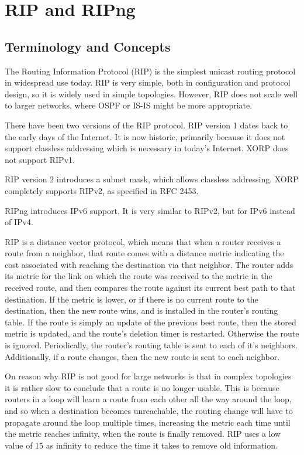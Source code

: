 %
%

\chapter{RIP and RIPng}
\label{rip}
\section{Terminology and Concepts}

The Routing Information Protocol (RIP) is the simplest unicast routing
protocol in widespread use today.  RIP is very simple, both in
configuration and protocol design, so it is widely used in simple
topologies.  However, RIP does not scale well to larger networks,
where OSPF or IS-IS might be more appropriate.

There have been two versions of the RIP protocol.  RIP version 1 dates
back to the early days of the Internet.  It is now historic, primarily
because it does not support classless addressing which is necessary in
today's Internet.  XORP does not support RIPv1.  

RIP version 2 introduces a subnet mask, which allows classless
addressing.  XORP completely supports RIPv2, as specified in RFC 2453.

RIPng introduces IPv6 support.  It is very similar to RIPv2, but for
IPv6 instead of IPv4.

RIP is a distance vector protocol, which means that when a router
receives a route from a neighbor, that route comes with a distance
metric indicating the cost associated with reaching the destination
via that neighbor.  The router adds its metric for the link on which
the route was received to the metric in the received route, and then
compares the route against its current best path to that destination.
If the metric is lower, or if there is no current route to the
destination, then the new route wins, and is installed in the router's
routing table.  If the route is simply an update of the previous best
route, then the stored metric is updated, and the route's deletion
timer is restarted.  Otherwise the route is ignored.  Periodically,
the router's routing table is sent to each of it's neighbors.
Additionally, if a route changes, then the new route is sent to each
neighbor.

On reason why RIP is not good for large networks is that in complex
topologies it is rather slow to conclude that a route is no longer
usable.  This is because routers in a loop will learn a route from
each other all the way around the loop, and so when a destination
becomes unreachable, the routing change will have to propagate around
the loop multiple times, increasing the metric each time until the
metric reaches infinity, when the route is finally removed.  RIP uses
a low value of 15 as infinity to reduce the time it takes to remove
old information.

